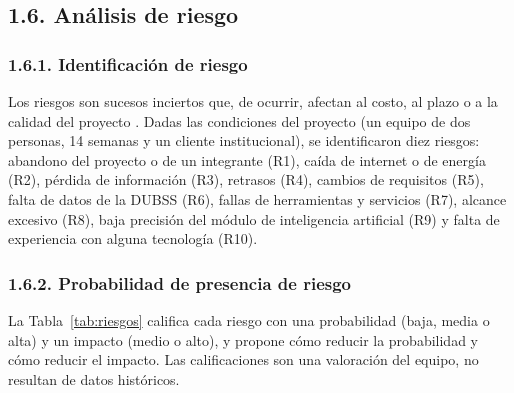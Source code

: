 \subsection{1.6. Análisis de riesgo}

\subsubsection{1.6.1. Identificación de riesgo}

Los riesgos son sucesos inciertos que, de ocurrir, afectan al costo, al plazo o a la calidad del proyecto \parencite{pressman2010ingenieria}. Dadas las condiciones del proyecto (un equipo de dos personas, 14 semanas y un cliente institucional), se identificaron diez riesgos: abandono del proyecto o de un integrante (R1), caída de internet o de energía (R2), pérdida de información (R3), retrasos (R4), cambios de requisitos (R5), falta de datos de la DUBSS (R6), fallas de herramientas y servicios (R7), alcance excesivo (R8), baja precisión del módulo de inteligencia artificial (R9) y falta de experiencia con alguna tecnología (R10).

\subsubsection{1.6.2. Probabilidad de presencia de riesgo}

La Tabla~\ref{tab:riesgos} califica cada riesgo con una probabilidad (baja, media o alta) y un impacto (medio o alto), y propone cómo reducir la probabilidad y cómo reducir el impacto. Las calificaciones son una valoración del equipo, no resultan de datos históricos.

